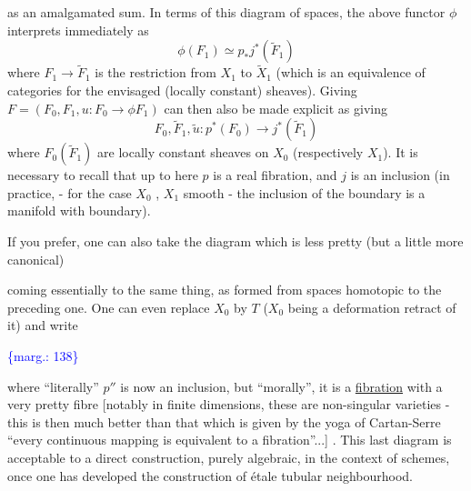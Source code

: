 \documentclass[11pt]{article}
\newcommand{\scanpage}[1]{\par\bigskip\noindent{\small\sffamily[scan #1]}\par}
\newcommand{\mspage}[1]{{\small\sffamily[p.\,#1]}}
\newcommand{\margin}[1]{\textcolor{blue}{\{\textsf{marg.:} #1\}}}
\newcommand{\uline}[1]{\underline{#1}}
\newenvironment{diagramblock}{\par\begin{center}}{\end{center}\par}
\begin{document}
as an amalgamated sum.  In terms of this diagram of spaces,
the above functor $\phi$ interprets immediately as
\[ \phi(F_1) \simeq p_* j^*(\tilde{F}_1) \]
where $F_1 \to \tilde{F}_1$ is the restriction from $X_1$ to $\tilde{X}_1$ (which is
an equivalence of categories for the envisaged (locally constant)
sheaves).  Giving $F = (F_0 , F_1 , u : F_0 \to \phi F_1)$ can then also
be made explicit as giving
\[ F_0 , \tilde{F}_1 , \tilde{u} : p^*(F_0) \to j^*(\tilde{F}_1) \]
where $F_0(\tilde{F}_1)$ are locally constant sheaves on $X_0$ (respectively
$X_1$).  It is necessary to recall that up to here $p$ is a real
fibration, and $j$ is an inclusion (in practice, - for the case
$X_0$ , $X_1$ smooth - the inclusion of the boundary is a manifold
with boundary).

If you prefer, one can also take the diagram which is less
pretty (but a little more canonical)
\begin{diagramblock}\end{diagramblock}
coming essentially to the same thing, as formed from spaces
homotopic to the preceding one.  One can even replace $X_0$ by $T$
($X_0$ being a deformation retract of it) and write
\begin{diagramblock}\end{diagramblock}

\margin{138}

\clearpage
\scanpage{134-2/138}
\mspage{- 11 -}

where ``literally'' $p''$ is now an inclusion, but ``morally'', it is
a \uline{fibration} with a very pretty fibre [notably in finite dimensions,
these are non-singular varieties - this is then much better than
that which is given by the yoga of Cartan-Serre ``every continuous
mapping is equivalent to a fibration''...] . This last diagram
is acceptable to a direct construction, purely algebraic, in the
context of schemes, once one has developed the construction of
étale tubular neighbourhood.
\end{document}
